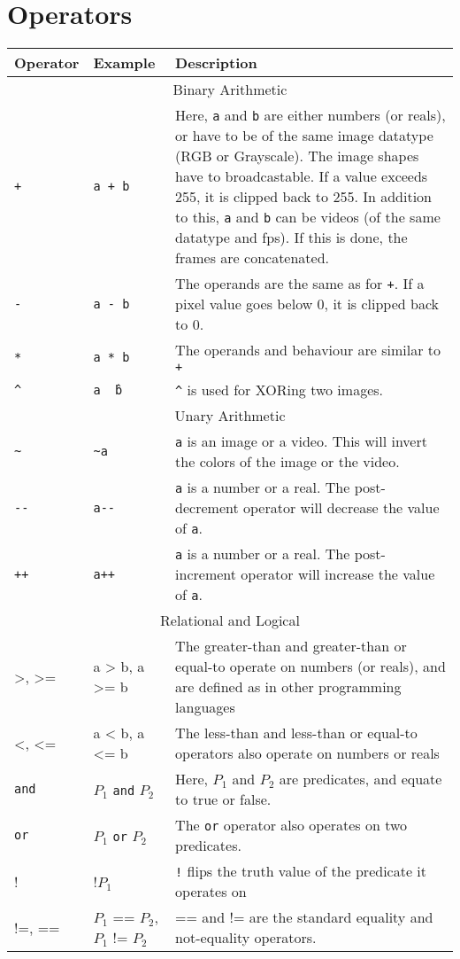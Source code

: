 \documentclass[a4paper, 11pt]{article}
\begin{document}
\section{Operators}
\begin{tabular}{ |p{3cm}|p{5cm}|p{7cm}|  }
  \hline
  Operator & Example & Description\\
  \hline
  \multicolumn{3}{|c|}{Binary Arithmetic} \\
  \hline
  \texttt{+} & \texttt{a + b} & Here, \texttt{a} and \texttt{b} are either numbers (or reals), or have to be of the same image datatype (RGB or Grayscale). The image shapes have to broadcastable. If a value exceeds 255, it is clipped back to 255. In addition to this, \texttt{a} and \texttt{b} can be videos (of the same datatype and fps). If this is done, the frames are concatenated.\\ \hline
  \texttt{-} & \texttt{a - b} & The operands are the same as for \texttt{+}. If a pixel value goes below 0, it is clipped back to 0.\\ \hline
  \texttt{*} & \texttt{a * b} & The operands and behaviour are similar to \texttt{+} \\ \hline
  \texttt{\^} & \texttt{a \^\ b} & \texttt{\^} is used for XORing two images. \\ \hline 
  \hline
  \multicolumn{3}{|c|}{Unary Arithmetic} \\
  \hline
  \texttt{\textasciitilde} & \texttt{\textasciitilde a} & \texttt{a} is an image or a video. This will invert the colors of the image or the video. \\ \hline
  \texttt{-{}-} & \texttt{a-{}-} & \texttt{a} is a number or a real. The post-decrement operator will decrease the value of \texttt{a}. \\ \hline
  \texttt{++} & \texttt{a++} & \texttt{a} is a number or a real. The post-increment operator will increase the value of \texttt{a}. \\ \hline
  \multicolumn{3}{|c|}{Relational and Logical} \\
  \hline
  >, >= & a > b, a >= b &  The greater-than and greater-than or equal-to operate on numbers (or reals), and are defined as in other programming languages \\  \hline
  <, <= & a < b, a <= b & The less-than and less-than or equal-to operators also operate on numbers or reals\\ \hline
  \texttt{and} & $P_1$ \texttt{and} $P_2$ & Here, $P_1$ and $P_2$ are predicates, and equate to true or false.\\ \hline
  \texttt{or} &  $P_1$ \texttt{or} $P_2$ & The \texttt{or} operator also operates on two predicates.\\ \hline
  ! & !$P_1$ & \texttt{!} flips the truth value of the predicate it operates on \\ \hline
  !=, == & $P_1$ == $P_2$, $P_1$ != $P_2$ & == and != are the standard equality and not-equality operators.\\
  \hline
 \end{tabular}
\end{document}
